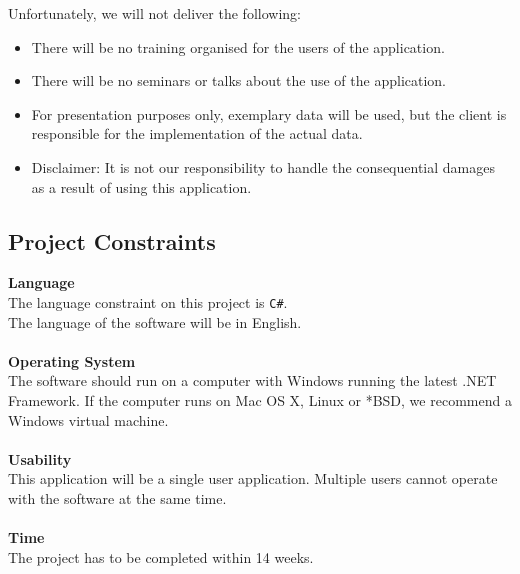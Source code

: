 \documentclass[a4paper,11pt]{article}
\begin{document}
    Unfortunately, we will not deliver the following:
    \begin{itemize}
    \item There will be no training organised for the users of the application.
    \item There will be no seminars or talks about the use of the application.
    \item For presentation purposes only, exemplary data will be used, but the client is responsible for the implementation of the actual data. 
    \item Disclaimer: It is not our responsibility to handle the consequential damages as a result of using this application.
    
    \end{itemize}
    
    \subsection{Project Constraints}
    \textbf{Language}\\The language constraint on this project is \texttt{C\#}.
    \\ The language of the software will be in English.
    \\
    \\
    \textbf{Operating System}\\ The software should run on a computer with Windows running the latest .NET Framework. If the computer runs on Mac OS X, Linux or *BSD, we recommend a Windows virtual machine.
    \\
    \\
    \textbf{Usability}
    \\This application will be a single user application. Multiple users cannot operate with the software at the same time.
    \\ 
    \\
    
    \textbf{Time}
    \\The project has to be completed within 14 weeks.
    
\end{document}
